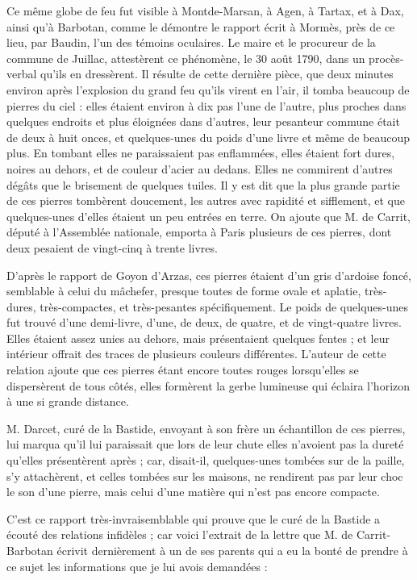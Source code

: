 \documentclass[a4paper, 12pt, oneside, french]{article}
\begin{document}
Ce même globe de feu fut visible à Montde-Marsan, à Agen, à Tartax, et à Dax, ainsi qu'à Barbotan, comme le démontre le rapport écrit à Mormès, près de ce lieu, par Baudin, l'un des témoins oculaires. Le maire et le procureur de la commune de Juillac, attestèrent ce phénomène, le 30 août 1790, dans un procès-verbal qu'ils en dressèrent. Il résulte de cette dernière pièce, que deux minutes environ après l'explosion du grand feu qu'ils virent en l'air, il tomba beaucoup de pierres du ciel : elles étaient environ à dix pas l'une de l'autre, plus proches dans quelques endroits et plus éloignées dans d'autres, leur pesanteur commune était de deux à huit onces, et quelques-unes du poids d'une livre et même de beaucoup plus. En tombant elles ne paraissaient pas enflammées, elles étaient fort dures, noires au dehors, et de couleur d'acier au dedans. Elles ne commirent d'autres dégâts que le brisement de quelques tuiles. Il y est dit que la plus grande partie de ces pierres tombèrent doucement, les autres avec rapidité et sifflement, et que quelques-unes d'elles étaient un peu entrées en terre. On ajoute que M. de Carrit, député à l'Assemblée nationale, emporta à Paris plusieurs de ces pierres, dont deux pesaient de vingt-cinq à trente livres.

D'après le rapport de Goyon d'Arzas, ces pierres étaient d'un gris d'ardoise foncé, semblable à celui du mâchefer, presque toutes de forme ovale et aplatie, très-dures, très-compactes, et très-pesantes spécifiquement. Le poids de quelques-unes fut trouvé d'une demi-livre, d'une, de deux, de quatre, et de vingt-quatre livres. Elles étaient assez unies au dehors, mais présentaient quelques fentes ; et leur intérieur offrait des traces de plusieurs couleurs différentes. L'auteur de cette relation ajoute que ces pierres étant encore toutes rouges lorsqu'elles se dispersèrent de tous côtés, elles formèrent la gerbe lumineuse qui éclaira l'horizon à une si grande distance.

M. Darcet, curé de la Bastide, envoyant à son frère un échantillon de ces pierres, lui marqua qu'il lui paraissait que lors de leur chute elles n'avoient pas la dureté qu'elles présentèrent après ; car, disait-il, quelques-unes tombées sur de la paille, s'y attachèrent, et celles tombées sur les maisons, ne rendirent pas par leur choc le son d'une pierre, mais celui d'une matière qui n'est pas encore compacte.

C'est ce rapport très-invraisemblable qui prouve que le curé de la Bastide a écouté des relations infidèles ; car voici l'extrait de la lettre que M. de Carrit-Barbotan écrivit dernièrement à un de ses parents qui a eu la bonté de prendre à ce sujet les informations que je lui avois demandées :
\end{document}
